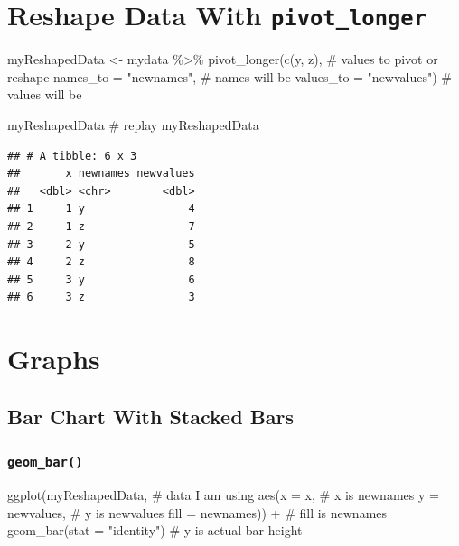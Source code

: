 \documentclass[nofonts,]{tufte-handout}
\newenvironment{Shaded}{}{}
\newcommand{\AttributeTok}[1]{#1}
\newcommand{\CommentTok}[1]{\textcolor[rgb]{0.00,0.50,0.00}{#1}}
\newcommand{\FunctionTok}[1]{#1}
\newcommand{\NormalTok}[1]{#1}
\newcommand{\OtherTok}[1]{\textcolor[rgb]{1.00,0.25,0.00}{#1}}
\newcommand{\SpecialCharTok}[1]{\textcolor[rgb]{0.00,0.50,0.50}{#1}}
\newcommand{\StringTok}[1]{\textcolor[rgb]{0.00,0.50,0.50}{#1}}
\begin{document}
\hypertarget{reshape-data-with-pivot_longer}{%
\section{\texorpdfstring{Reshape Data With
\texttt{pivot\_longer}}{Reshape Data With pivot\_longer}}\label{reshape-data-with-pivot_longer}}

\begin{Shaded}
\begin{Highlighting}[]
\NormalTok{myReshapedData }\OtherTok{\textless{}{-}}\NormalTok{ mydata }\SpecialCharTok{\%\textgreater{}\%} 
  \FunctionTok{pivot\_longer}\NormalTok{(}\FunctionTok{c}\NormalTok{(y, z), }\CommentTok{\# values to pivot or reshape}
               \AttributeTok{names\_to =} \StringTok{"newnames"}\NormalTok{, }\CommentTok{\# names will be}
               \AttributeTok{values\_to =} \StringTok{"newvalues"}\NormalTok{) }\CommentTok{\# values will be}

\NormalTok{myReshapedData }\CommentTok{\# replay myReshapedData}
\end{Highlighting}
\end{Shaded}

\begin{verbatim}
## # A tibble: 6 x 3
##       x newnames newvalues
##   <dbl> <chr>        <dbl>
## 1     1 y                4
## 2     1 z                7
## 3     2 y                5
## 4     2 z                8
## 5     3 y                6
## 6     3 z                3
\end{verbatim}

\hypertarget{graphs}{%
\section{Graphs}\label{graphs}}

\hypertarget{bar-chart-with-stacked-bars}{%
\subsection{Bar Chart With Stacked
Bars}\label{bar-chart-with-stacked-bars}}

\hypertarget{geom_bar}{%
\subsubsection{\texorpdfstring{\texttt{geom\_bar()}}{geom\_bar()}}\label{geom_bar}}

\begin{Shaded}
\begin{Highlighting}[]
\FunctionTok{ggplot}\NormalTok{(myReshapedData, }\CommentTok{\# data I am using}
       \FunctionTok{aes}\NormalTok{(}\AttributeTok{x =}\NormalTok{ x, }\CommentTok{\# x is newnames}
           \AttributeTok{y =}\NormalTok{ newvalues, }\CommentTok{\# y is newvalues}
           \AttributeTok{fill =}\NormalTok{ newnames)) }\SpecialCharTok{+} \CommentTok{\# fill is newnames}
  \FunctionTok{geom\_bar}\NormalTok{(}\AttributeTok{stat =} \StringTok{"identity"}\NormalTok{) }\CommentTok{\# y is actual bar height}
\end{Highlighting}
\end{Shaded}
\end{document}
